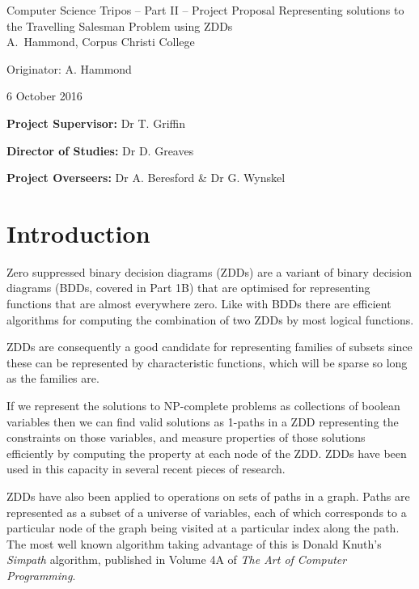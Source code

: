 \documentclass[12pt,a4paper,twoside]{article}
\begin{document}
\begin{center}
\Large
Computer Science Tripos -- Part II -- Project Proposal
\LARGE
Representing solutions to the Travelling Salesman Problem using ZDDs\\[4mm]

\large
A.~Hammond, Corpus Christi College

Originator: A. Hammond

6 October 2016
\end{center}

\vspace{5mm}

\textbf{Project Supervisor:} Dr T. Griffin

\textbf{Director of Studies:} Dr D. Greaves

\textbf{Project Overseers:} Dr A. Beresford  \& Dr G. Wynskel


\section*{Introduction}

Zero suppressed binary decision diagrams (ZDDs) are a variant of binary decision diagrams (BDDs, covered in Part 1B) that are optimised for representing functions that are almost everywhere zero. Like with BDDs there are efficient algorithms for computing the combination of two ZDDs by most logical functions.

ZDDs are consequently a good candidate for representing families of subsets since these can be represented by characteristic functions, which will be sparse so long as the families are.

If we represent the solutions to NP-complete problems as collections of boolean variables then we can find valid solutions as 1-paths in a ZDD representing the constraints on those variables, and measure properties of those solutions efficiently by computing the property at each node of the ZDD. ZDDs have been used in this capacity in several recent pieces of research\cite{numberlink}\cite{ind}.

ZDDs have also been applied to operations on sets of paths in a graph. Paths are represented as a subset of a universe of variables, each of which corresponds to a particular node of the graph being visited at a particular index along the path. The most well known algorithm taking advantage of this is Donald Knuth's \textit{Simpath} algorithm, published in Volume 4A of \textit{The Art of Computer Programming}. 
\end{document}
